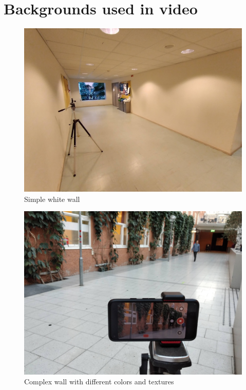 \chapter{Backgrounds used in video}\label{cha:appendix-backgrounds}
\begin{figure}[H]
    \centering
    \includegraphics[width=\textwidth]{img/background_setup/simple_white_wall.jpg}
    \caption{Simple white wall}
    \label{fig:white_wall_setup}
\end{figure}
\begin{figure}[H]
    \centering
    \includegraphics[width=\textwidth]{img/background_setup/complex_wall.jpg}
    \caption{Complex wall with different colors and textures}
    \label{fig:complex_setup}
\end{figure}
